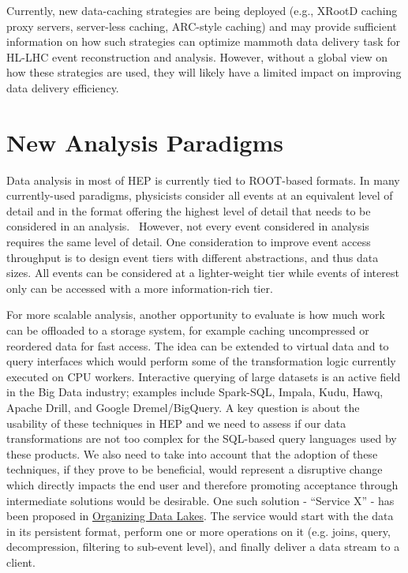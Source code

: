 \documentclass[12pt,a4paper]{article}
\begin{document}
Currently, new data-caching strategies are being deployed (e.g., XRootD
caching proxy servers, server-less caching, ARC-style caching) and may
provide sufficient information on how such strategies can optimize
mammoth data delivery task for HL-LHC event reconstruction and analysis.
However, without a global view on how these strategies are used, they
will likely have a limited impact on improving data delivery efficiency.

\section{New Analysis Paradigms}\label{new-analysis-paradigms}

Data analysis in most of HEP is currently tied to ROOT-based formats. In many
currently-used paradigms, physicists consider all events at an
equivalent level of detail and in the format offering the highest level
of detail that needs to be considered in an analysis. ~However, not
every event considered in analysis requires the same level of detail.
One consideration to improve event access throughput is to design event
tiers with different abstractions, and thus data sizes. All events can
be considered at a lighter-weight tier while events of interest only can
be accessed with a more information-rich tier.

For more scalable analysis, another opportunity to evaluate is how much
work can be offloaded to a storage system, for example caching
uncompressed or reordered data for fast access. The idea can be extended
to virtual data and to query interfaces which would perform some of the
transformation logic currently executed on CPU workers. Interactive
querying of large datasets is an active field in the Big Data industry;
examples include Spark-SQL, Impala, Kudu, Hawq, Apache Drill, and Google
Dremel/BigQuery. A key question is about the usability of these
techniques in HEP and we need to assess if our data transformations are
not too complex for the SQL-based query languages used by these
products. We also need to take into account that the adoption of these
techniques, if they prove to be beneficial, would represent a disruptive
change which directly impacts the end user and therefore promoting
acceptance through intermediate solutions would be desirable. One such solution - ``Service X'' - has been proposed in \href{https://bit.ly/2Ix9NIL}{Organizing Data Lakes}. The service would start with the data in its persistent format, perform one or more operations on it  (e.g. joins, query, decompression, filtering to sub-event level), and finally deliver a data stream to a client.
\end{document}
